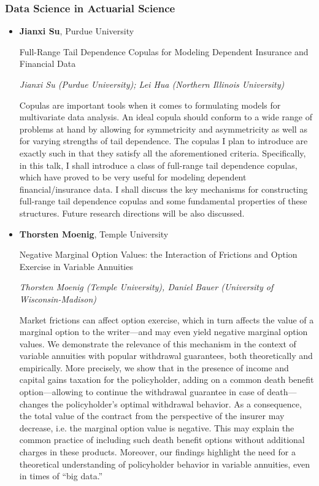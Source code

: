 \subsubsection*{Data Science in Actuarial Science}

\begin{itemize}
\item \textbf{Jianxi Su}, Purdue University

Full-Range Tail Dependence Copulas for Modeling Dependent Insurance and Financial Data

\emph{\footnotesize Jianxi Su (Purdue University); Lei Hua (Northern Illinois University)}

Copulas are important tools when it comes to formulating models for multivariate data analysis.  An ideal copula should conform to a wide range of problems at hand by allowing for symmetricity and asymmetricity as well as for varying strengths of tail dependence. The copulas I plan to introduce are exactly such in that they satisfy all the aforementioned criteria. Specifically, in this talk, I shall introduce a class of full-range tail dependence copulas, which have proved to be very useful for modeling dependent financial/insurance data. I shall discuss the key mechanisms for constructing full-range tail dependence copulas and some fundamental properties of these structures.  Future research directions will be also discussed. 


\item \textbf{Thorsten Moenig}, Temple University

Negative Marginal Option Values:  the Interaction of Frictions and Option Exercise in Variable Annuities

\emph{\footnotesize Thorsten Moenig (Temple University), Daniel Bauer (University of Wisconsin-Madison)}

Market frictions can affect option exercise, which in turn affects the value of a marginal option to the writer---and may even yield negative marginal option values.  We demonstrate the relevance of this mechanism in the context of variable annuities with popular withdrawal guarantees, both theoretically and empirically.  More precisely, we show that in the presence of income and capital gains taxation for the policyholder, adding on a common death benefit option---allowing to continue the withdrawal guarantee in case of death---changes the policyholder's optimal withdrawal behavior.  As a consequence, the total value of the contract from the perspective of the insurer may decrease, i.e. the marginal option value is negative.  This may explain the common practice of including such death benefit options without additional charges in these products.  Moreover, our findings highlight the need for a theoretical understanding of policyholder behavior in variable annuities, even in times of ``big data.''


\end{itemize}

